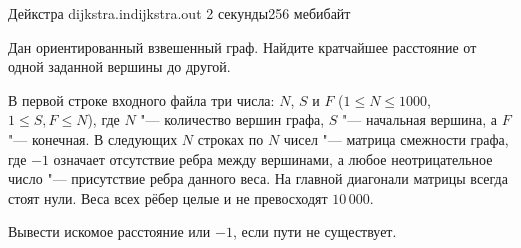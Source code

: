 \begin{problem}{Дейкстра}
{dijkstra.in}{dijkstra.out}
{2 секунды}{256 мебибайт}{}

Дан ориентированный взвешенный граф.
Найдите кратчайшее расстояние от одной заданной вершины до другой.

\InputFile

В первой строке входного файла три числа: $N$, $S$ и $F$
($1 \le N \le 1000$, $1 \le S, F \le N$), 
где $N$ "--- количество вершин графа, $S$ "--- начальная вершина,
а $F$ "--- конечная. 
В следующих $N$ строках по $N$ чисел "--- матрица смежности графа,
где $-1$ означает отсутствие ребра между вершинами,
а любое неотрицательное число "--- присутствие ребра данного веса.
На главной диагонали матрицы всегда стоят нули. Веса всех рёбер целые
и не превосходят $10\,000$.

\OutputFile

Вывести искомое расстояние или $-1$, если пути не существует.

\Example

\begin{example}
%
\end{example}

\end{problem}
